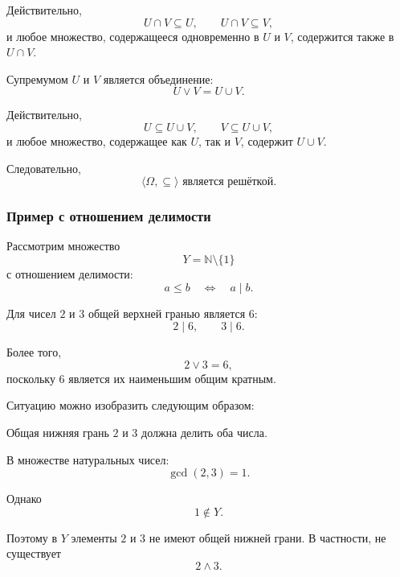 \documentclass[12pt,a4paper,oneside,openany]{book}
\theoremstyle{definition}
\theoremstyle{plain}
\theoremstyle{remark}
\begin{document}
Действительно,
\[
U\cap V\subseteq U,
\qquad
U\cap V\subseteq V,
\]
и любое множество, содержащееся одновременно в \(U\) и \(V\),
содержится также в \(U\cap V\).

Супремумом \(U\) и \(V\) является объединение:
\[
U\vee V=U\cup V.
\]

Действительно,
\[
U\subseteq U\cup V,
\qquad
V\subseteq U\cup V,
\]
и любое множество, содержащее как \(U\), так и \(V\), содержит
\(U\cup V\).

Следовательно,
\[
\boxed{
\langle\Omega,\subseteq\rangle
\text{ является решёткой}.
}
\]

\subsubsection{Пример с отношением делимости}

Рассмотрим множество
\[
Y=\mathbb N\setminus\{1\}
\]
с отношением делимости:
\[
a\leq b
\quad\Longleftrightarrow\quad
a\mid b.
\]

Для чисел \(2\) и \(3\) общей верхней гранью является \(6\):
\[
2\mid 6,
\qquad
3\mid 6.
\]

Более того,
\[
2\vee3=6,
\]
поскольку \(6\) является их наименьшим общим кратным.

Ситуацию можно изобразить следующим образом:

\begin{center}
\end{center}

Общая нижняя грань \(2\) и \(3\) должна делить оба числа.

В множестве натуральных чисел:
\[
\gcd(2,3)=1.
\]

Однако
\[
1\notin Y.
\]

Поэтому в \(Y\) элементы \(2\) и \(3\) не имеют общей нижней грани.
В частности, не существует
\[
2\wedge3.
\]
\end{document}
